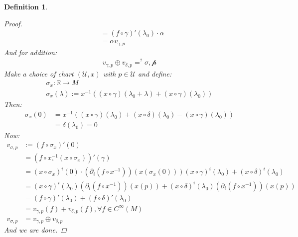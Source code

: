 \documentclass[10pt, oneside]{article}
\newcommand{\R}{\mathbb{R}}
\newtheorem{defn}{Definition}
\begin{document}
\begin{defn}
\begin{proof}
\begin{align*}
              &= (f \circ \gamma)' (\lambda_0) \cdot \alpha \\
              &= \alpha v_{\gamma,p}
           \end{align*}
           And for addition:
           \begin{align*}
              v_{\gamma,p} \oplus v_{\delta,p} =^? \mathcal{\sigma,p}
           \end{align*}
           Make a choice of chart $(\mathcal{U},x)$ with $p \in \mathcal{U}$ and define:
           \begin{align*}
              \sigma_x: \R \to M \\
              \sigma_x(\lambda) := x^{-1} ((x \circ \gamma)(\lambda_0 + \lambda)+ (x \circ \gamma)(\lambda_0))
           \end{align*}
           Then:
           \begin{align*}
              \sigma_x (0) &= x^{-1} ((x \circ \gamma)(\lambda_0)+(x \circ \delta)(\lambda_0)-(x \circ \gamma)(\lambda_0)) \\
              &= \delta(\lambda_0) = 0  
           \end{align*}
           Now:
           \begin{align*}
              v_{\sigma ,p} &:= (f \circ \sigma_x)' (0) \\
              &= (f \circ x^{-1}_\circ(x \circ \sigma_x))'(\gamma) \\
              &= (x \circ \sigma_x)^i(0) \cdot (\partial_i (f \circ x^{-1}))(x(\sigma_x(0))) (x \circ \gamma)^i (\lambda_0) + (x \circ \delta)^i (\lambda_0)\\
              &= (x \circ \gamma)^i(\lambda_0)(\partial_i(f \circ x^{-1}))(x(p)) + (x \circ \delta)^i(\lambda_0)(\partial_i(f \circ x^{-1}))(x(p)) \\
              &= (f \circ \gamma)'(\lambda_0) + (f \circ \delta)' (\lambda_0) \\
              &= v_{\gamma,p}(f) + v_{\delta,p}(f), \forall f \in C^\infty (M) \\
              v_{\sigma,p} &= v_{\gamma,p} \oplus v_{\delta,p}
           \end{align*}
           And we are done.
        \end{proof}
     \end{defn}
\end{document}
